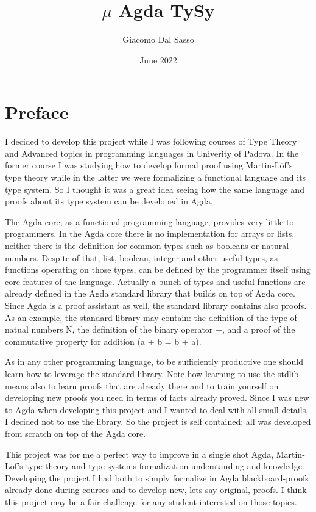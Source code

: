\documentclass{article}
\title{$\mu$ Agda TySy}
\author{Giacomo Dal Sasso}
\date{June 2022}
\begin{document}
\maketitle

\section{Preface}

I decided to develop this project while I was following courses of Type Theory and Advanced topics in programming languages in Univerity of Padova.
In the former course I was studying how to develop formal proof using Martin-Löf's type theory while in the latter we were formalizing a functional language and its type system.
So I thought it was a great idea seeing how the same language and proofs about its type system can be developed in Agda.

The Agda core, as a functional programming language, provides very little to programmers.
In the Agda core there is no implementation for arrays or lists, neither there is the definition for common types such as booleans or natural numbers.
Despite of that, list, boolean, integer and other useful types, as functions operating on those types, can be defined by the programmer itself using core features of the language.
Actually a bunch of types and useful functions are already defined in the Agda standard library that builds on top of Agda core.
Since Agda is a proof assistant as well, the standard library contains also proofs.
As an example, the standard library may contain: the definition of the type of natual numbers N, the definition of the binary operator +, and a proof of the commutative property for addition (a + b = b + a).

As in any other programming language, to be sufficiently productive one should learn how to leverage the standard library.
Note how learning to use the stdlib means also to learn proofs that are already there and to train yourself on developing new proofs you need in terms of facts already proved.
Since I was new to Agda when developing this project and I wanted to deal with all small details, I decided not to use the library.
So the project is self contained; all was developed from scratch on top of the Agda core.

This project was for me a perfect way to improve in a single shot Agda, Martin-Löf's type theory and type systems formalization understanding and knowledge.
Developing the project I had both to simply formalize in Agda blackboard-proofs already done during courses and to develop new, lets say original, proofs.
I think this project may be a fair challenge for any student interested on those topics.
\end{document}
